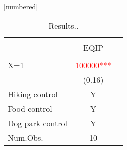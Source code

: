 \begin{table}
[numbered]
\caption{Results..}
    \vspace{-.2cm} 
\centering
\begin{tabular}[t]{lcc}
\\[-1.8ex]
\hline \\[-1.8ex] 
\multicolumn{1}{c}{ } & \multicolumn{1}{c}{EQIP} \\
\hline \\[-1.8ex] 
X=1 &\textcolor{red} {\num{100000}***} &   \\
    & (\num{0.16}) \\

Hiking control & Y \\
Food control& Y  \\
Dog park control& Y  \\
Num.Obs. & \num{10}  \\
\bottomrule

\end{tabular}

\end{table}